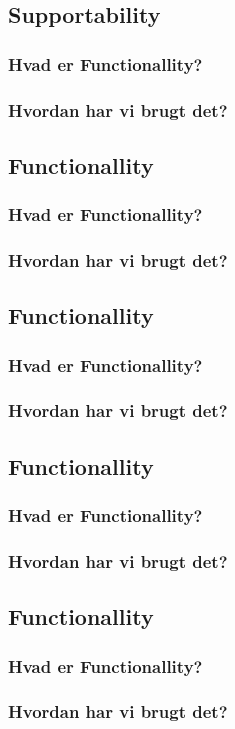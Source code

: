 \subsection{Supportability}
\subsubsection{Hvad er Functionallity?}
\subsubsection{Hvordan har vi brugt det?}
\subsection{Functionallity}
\subsubsection{Hvad er Functionallity?}
\subsubsection{Hvordan har vi brugt det?}
\subsection{Functionallity}
\subsubsection{Hvad er Functionallity?}
\subsubsection{Hvordan har vi brugt det?}
\subsection{Functionallity}
\subsubsection{Hvad er Functionallity?}
\subsubsection{Hvordan har vi brugt det?}
\subsection{Functionallity}
\subsubsection{Hvad er Functionallity?}
\subsubsection{Hvordan har vi brugt det?}